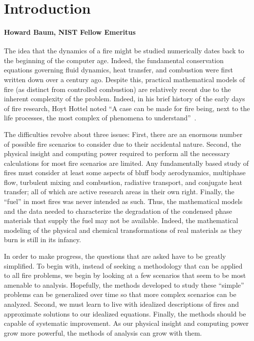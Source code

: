 

\chapter{Introduction}
\subsubsection*{Howard Baum, NIST Fellow Emeritus}

The idea that the dynamics of a fire might be studied numerically dates back
to the beginning of the computer age. Indeed, the fundamental
conservation equations governing fluid dynamics, heat transfer, and
combustion were first written down over a century ago.
Despite this, practical mathematical models of fire
(as distinct from controlled combustion) are relatively recent due
to the inherent complexity of the problem.
Indeed, in his brief history of the early days of fire research,
Hoyt Hottel noted ``A case can be made for fire being,
next to the life processes, the most complex of phenomena to understand''~\cite{Hottel:1}.

The difficulties revolve about three issues:
First, there are an enormous number of possible fire scenarios
to consider due to their accidental nature. Second, the physical
insight and computing power required to perform all the necessary calculations
for most fire scenarios are limited. Any fundamentally based study of fires
must consider at least some aspects of bluff body aerodynamics, multiphase flow,
turbulent mixing and combustion, radiative transport, and conjugate heat transfer;
all of which are active research areas in their own right.
Finally, the ``fuel'' in most fires was never intended as such.
Thus, the mathematical models and the data needed to characterize the
degradation of the condensed phase materials that supply the fuel may not be available.
Indeed, the mathematical modeling of the physical and
chemical transformations of real materials as they burn is still in its infancy.

In order to make progress, the questions that are asked have to be greatly simplified.
To begin with, instead of seeking a methodology that can be applied to all fire problems,
we begin by looking at a few scenarios that seem to be most amenable to analysis.
Hopefully, the methods developed to study these ``simple'' problems can be generalized
over time so that more complex scenarios can be analyzed.
Second, we must learn to live with idealized descriptions of fires and approximate
solutions to our idealized equations. Finally, the methods should be capable of systematic improvement.
As our physical insight and computing power grow more powerful, the methods of analysis can
grow with them.

